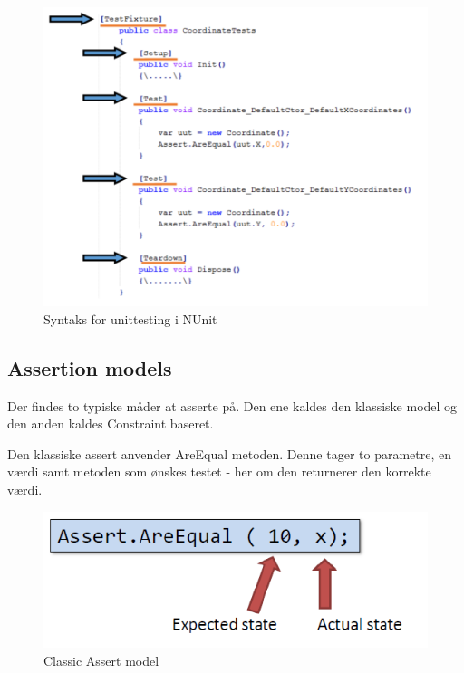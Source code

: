 \begin{figure}[H]
\centering
\includegraphics[width=0.7\linewidth]{figs/testFixture.PNG}
\caption{Syntaks for unittesting i NUnit}
\label{fig:testFixture}
\end{figure}

\subsection{Assertion models}
Der findes to typiske måder at asserte på. Den ene kaldes den klassiske model og den anden kaldes Constraint baseret.

Den klassiske assert anvender AreEqual metoden. Denne tager to parametre, en værdi samt metoden som ønskes testet - her om den returnerer den korrekte værdi.
\begin{figure}
\centering
\includegraphics[width=0.7\linewidth]{figs/classicAssert.PNG}
\caption{Classic Assert model}
\label{fig:classicAssert}
\end{figure}


